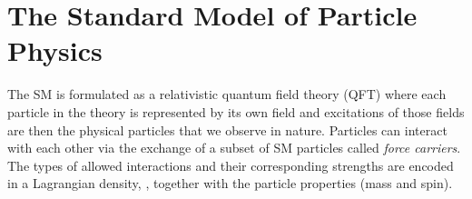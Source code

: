 \section{The Standard Model of Particle Physics}\label{sec:sm}

The SM is formulated as a relativistic quantum field theory (QFT) where each particle in the theory is represented by its own field and excitations of those fields are then the physical particles that we observe in nature. Particles can interact with each other via the exchange of a subset of SM particles called \textit{force carriers}. The types of allowed interactions and their corresponding strengths are encoded in a Lagrangian density, \LSM, together with the particle properties (mass and spin). 





